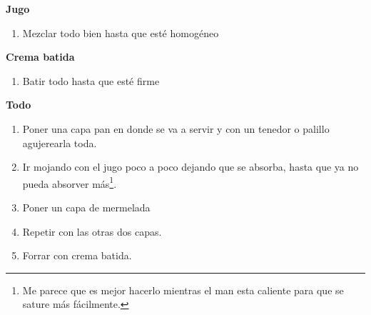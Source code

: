 \textbf{Jugo}
\begin{enumerate}
\item Mezclar todo bien hasta que esté homogéneo
\end{enumerate}

\textbf{Crema batida}
\begin{enumerate}
\item Batir todo hasta que esté firme
\end{enumerate}

\textbf{Todo}
\begin{enumerate}
\item Poner una capa pan en donde se va a servir y con un tenedor o palillo agujerearla toda.
\item Ir mojando con el jugo poco a poco dejando que se absorba, hasta que ya no pueda absorver más\footnote{Me parece que es mejor hacerlo mientras el man esta caliente para que se sature más f\'acilmente.}.
\item Poner un capa de mermelada
\item Repetir con las otras dos capas.
\item Forrar con crema batida.
\end{enumerate}